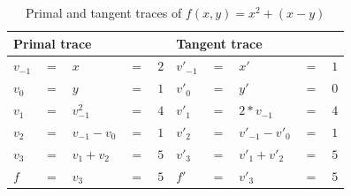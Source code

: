 \begin{table}
  \begin{center}
    \begin{tabular}{ l l l l l | l l l l l }
      \hline
      \multicolumn{5}{l}{Primal trace} & \multicolumn{5}{l}{Tangent trace} \\
      \hline
$v_{-1} $&$=$&$x$&$=$&$2$             &$v'_{-1}$&$=$&$x'$&$=$&$1$ \\
$v_0    $&$=$&$y$&$=$&$1$             &$v'_{0}$&$=$&$y'$&$=$&$0$ \\
      \hline
$v_1    $&$=$&$v_{-1}^2$&$=$&$4$      &$v'_{1}$&$=$&$2*v_{-1}$&$=$&$4$ \\
$v_2    $&$=$&$v_{-1} - v_{0}$&$=$&$1$&$v'_{2}$&$=$&$v'_{-1}-v'_{0}$&$=$&$1$ \\
$v_3    $&$=$&$v_1 + v_2$&$=$&$5$     &$v'_{3}$&$=$&$v'_1 + v'_2$&$=$&$5$ \\
      \hline
$f      $&$=$&$v_3$&$=$&$5$           &$f'$&$=$&$v'_3$&$=$&$5$ \\
      \hline
    \end{tabular}
  \end{center}
  \caption{Primal and tangent traces of $f(x, y) = x^2 + (x - y)$}
  \label{table:func_trace}
\end{table}
